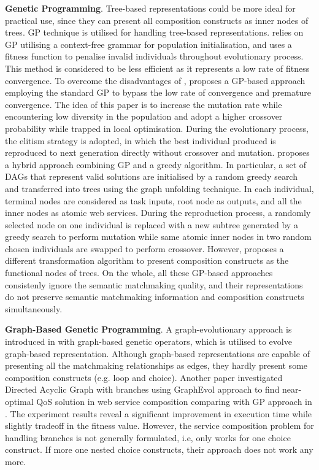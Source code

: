 \textbf{Genetic Programming}.
Tree-based representations could be more ideal for practical use, since they can present all composition constructs as inner nodes of trees. GP technique is utilised for handling tree-based representations. \cite {rodriguez2010composition} relies on GP utilising a context-free grammar for population initialisation, and uses a fitness function to penalise invalid individuals throughout evolutionary process. This method is considered to be less efficient as it represents a low rate of fitness convergence. To overcome the disadvantages of \cite {rodriguez2010composition}, \cite{yu2013adaptive} proposes a GP-based approach employing the standard GP to bypass the low rate of convergence and premature convergence. The idea of this paper is to increase the mutation rate while encountering low diversity in the population and adopt a higher crossover probability while trapped in local optimisation.  During the evolutionary process, the elitism strategy is adopted, in which the best individual produced is reproduced to next generation directly without crossover and mutation. \cite{ma2015hybrid} proposes a hybrid approach combining GP and a greedy algorithm. In particular, a set of DAGs that represent valid solutions are initialised by a random greedy search and transferred into trees using the graph unfolding technique.  In each individual,  terminal nodes are considered as task inputs,  root node as  outputs, and all the inner nodes as atomic web services. During the reproduction process,  a randomly selected node on one individual is replaced with a new subtree generated by a greedy search to perform mutation while same atomic inner nodes in two random chosen individuals are swapped to perform crossover. However, \cite{da2016genetic} proposes a different transformation algorithm to present composition constructs as the functional nodes of trees. On the whole, all these GP-based approaches \cite{ma2015hybrid,rodriguez2010composition,da2016genetic,yu2013adaptive} consistenly ignore the semantic matchmaking quality, and their representations do not preserve semantic matchmaking information and composition constructs simultaneously. 

\textbf{Graph-Based Genetic Programming}.
A graph-evolutionary approach is introduced in \cite{da2015graphevol} with graph-based genetic operators, which is utilised to evolve graph-based representation. Although graph-based representations are capable of presenting all the matchmaking relationships as edges, they hardly present some composition constructs (e.g. loop and choice). Another paper \cite{da2016handling} investigated Directed Acyclic Graph with branches using GraphEvol approach \cite{da2015graphevol} to find near-optimal QoS solution in web service composition comparing with GP approach in \cite{da2015gp}. The experiment results reveal a significant improvement in execution time while slightly tradeoff in the fitness value. However, the service composition problem for handling branches is not generally formulated, i.e, only works for one choice construct. If more one nested choice constructs, their approach does not work any more.


